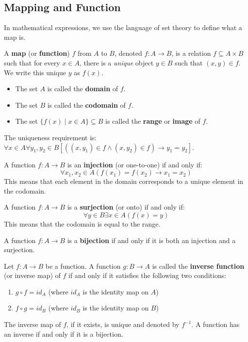 \subsection{Mapping and Function}
In mathematical expressions, we use the language of set theory to define what a map is.
\begin{definition}
A \textbf{map} (or \textbf{function}) $f$ from $A$ to $B$, denoted $f: A \to B$, is a relation $f \subseteq A \times B$ such that for every $x \in A$, there is a \emph{unique} object $y \in B$ such that $(x,y) \in f$. We write this unique $y$ as $f(x)$.
\begin{itemize}
    \item The set $A$ is called the \textbf{domain} of $f$.
    \item The set $B$ is called the \textbf{codomain} of $f$.
    \item The set $\{f(x) \mid x \in A\} \subseteq B$ is called the \textbf{range} or \textbf{image} of $f$.
\end{itemize}
The uniqueness requirement is: $\forall x \in A \forall y_1, y_2 \in B [((x,y_1) \in f \wedge (x,y_2) \in f) \to y_1 = y_2]$.
\end{definition}

\begin{definition}[Injection]
A function $f: A \to B$ is an \textbf{injection} (or one-to-one) if and only if:
$$ \forall x_1, x_2 \in A (f(x_1) = f(x_2) \to x_1 = x_2) $$
This means that each element in the domain corresponds to a unique element in the codomain.
\end{definition}

\begin{definition}[Surjection]
A function $f: A \to B$ is a \textbf{surjection} (or onto) if and only if:
$$ \forall y \in B \exists x \in A (f(x) = y) $$
This means that the codomain is equal to the range.
\end{definition}

\begin{definition}[Bijection]
A function $f: A \to B$ is a \textbf{bijection} if and only if it is both an injection and a surjection.
\end{definition}

\begin{definition}
Let $f: A \to B$ be a function. A function $g: B \to A$ is called the \textbf{inverse function} (or inverse map) of $f$ if and only if it satisfies the following two conditions:
\begin{enumerate}
    \item $g \circ f = id_A$ (where $id_A$ is the identity map on $A$)
    \item $f \circ g = id_B$ (where $id_B$ is the identity map on $B$)
\end{enumerate}
The inverse map of $f$, if it exists, is unique and denoted by $f^{-1}$. A function has an inverse if and only if it is a bijection.
\end{definition}

